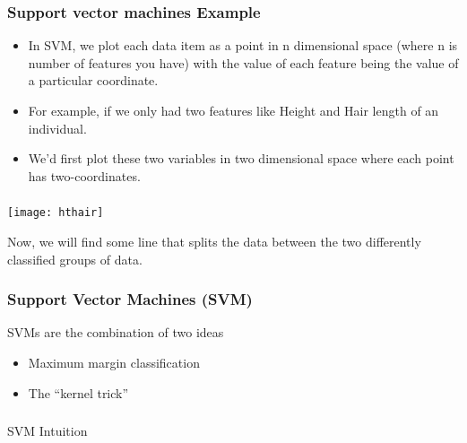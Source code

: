 \begin{frame}[fragile] \frametitle{Support vector machines Example}

\begin{itemize}
\item In SVM, we plot each data item as a point in n dimensional space (where n is number of features you have) with the value of each feature being the value of
a particular coordinate.
\item For example, if we only had two features like Height and Hair length of an individual.
\item We'd first plot these two variables in two dimensional space where each point has two-coordinates.
\end{itemize}
\end{frame}


\begin{frame}[fragile] \frametitle{}

\begin{center}
\texttt{[image: hthair]}
\end{center}
Now, we will find some line that splits the data between the two differently classified groups of
data.
\end{frame}

\begin{frame}[fragile]\frametitle{Support Vector Machines (SVM)}
SVMs are the combination of two ideas
	\begin{itemize}
	\item Maximum margin classification
	\item The ``kernel trick''
	\end{itemize}
\end{frame}


\begin{frame}[fragile]\frametitle{}
\begin{center}
{\Large SVM Intuition}
\end{center}
\end{frame}

